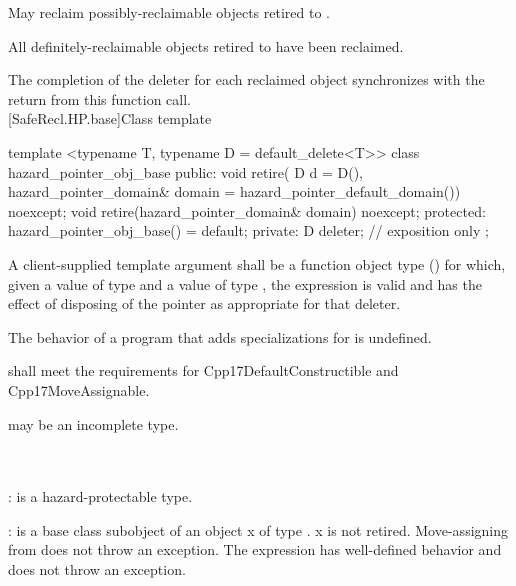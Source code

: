 \pnum
\effects May reclaim possibly-reclaimable objects retired to .

\pnum
\postconditions All definitely-reclaimable objects retired to  have been reclaimed.

\pnum
\sync The completion of the deleter for each reclaimed object synchronizes with the return from this function call.
\\

[SafeRecl.HP.base]{Class template }

\begin{codeblock}
template <typename T, typename D = default_delete<T>>
class hazard_pointer_obj_base {
public:
  void retire(
    D d = D(),
    hazard_pointer_domain& domain = hazard_pointer_default_domain()) noexcept;
  void retire(hazard_pointer_domain& domain) noexcept;
protected:
  hazard_pointer_obj_base() = default;
private:
  D deleter; // exposition only
};
\end{codeblock}

\pnum
A client-supplied template argument  shall be a function object type ()
for which, given a value  of type  and a value  of type , the expression  is valid and has the effect of disposing of the pointer as appropriate for that deleter.

\pnum
The behavior of a program that adds specializations for  is undefined.

\pnum
{} shall meet the requirements for Cpp17DefaultConstructible and Cpp17MoveAssignable.

\pnum
{} may be an incomplete type.
\\

\\
\hspace*{1.1em}\\
\hspace*{1.1em}

\pnum
{}:  is a hazard-protectable type.

\pnum
{}:  is a base class subobject of an object x of type . x is not retired.
Move-assigning  from  does not throw an exception. The expression  has well-defined behavior and does not throw an exception.


